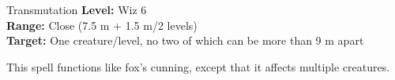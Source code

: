 {Transmutation}
{
	\textbf{Level:}
	Wiz 6\\
	\textbf{Range:}
	Close (7.5 m + 1.5 m/2 levels)\\
	\textbf{Target:}
	One creature/level, no two of which can be more than 9 m apart\\
}
{
	This spell functions like fox's cunning, except that it affects multiple creatures.

}
